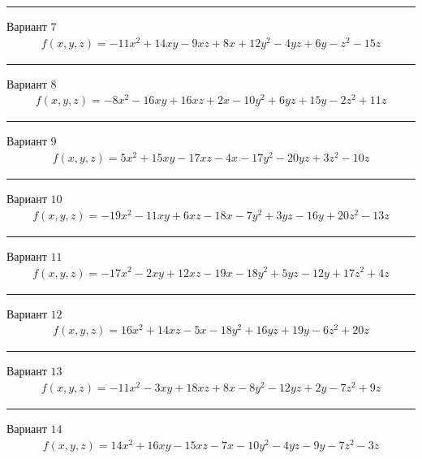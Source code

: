 \documentclass[11pt]{report}
\begin{document}
\begin{center}
\noindent\rule{8cm}{0.4pt}
\end{center}
Вариант $7$
\begin{align*}
    f(x, y, z) = - 11 x^{2} + 14 x y - 9 x z + 8 x + 12 y^{2} - 4 y z + 6 y - z^{2} - 15 z
\end{align*}
\begin{center}
\noindent\rule{8cm}{0.4pt}
\end{center}
Вариант $8$
\begin{align*}
    f(x, y, z) = - 8 x^{2} - 16 x y + 16 x z + 2 x - 10 y^{2} + 6 y z + 15 y - 2 z^{2} + 11 z
\end{align*}
\begin{center}
\noindent\rule{8cm}{0.4pt}
\end{center}
Вариант $9$
\begin{align*}
    f(x, y, z) = 5 x^{2} + 15 x y - 17 x z - 4 x - 17 y^{2} - 20 y z + 3 z^{2} - 10 z
\end{align*}
\begin{center}
\noindent\rule{8cm}{0.4pt}
\end{center}
Вариант $10$
\begin{align*}
    f(x, y, z) = - 19 x^{2} - 11 x y + 6 x z - 18 x - 7 y^{2} + 3 y z - 16 y + 20 z^{2} - 13 z
\end{align*}
\begin{center}
\noindent\rule{8cm}{0.4pt}
\end{center}
Вариант $11$
\begin{align*}
    f(x, y, z) = - 17 x^{2} - 2 x y + 12 x z - 19 x - 18 y^{2} + 5 y z - 12 y + 17 z^{2} + 4 z
\end{align*}
\begin{center}
\noindent\rule{8cm}{0.4pt}
\end{center}
Вариант $12$
\begin{align*}
    f(x, y, z) = 16 x^{2} + 14 x z - 5 x - 18 y^{2} + 16 y z + 19 y - 6 z^{2} + 20 z
\end{align*}
\begin{center}
\noindent\rule{8cm}{0.4pt}
\end{center}
Вариант $13$
\begin{align*}
    f(x, y, z) = - 11 x^{2} - 3 x y + 18 x z + 8 x - 8 y^{2} - 12 y z + 2 y - 7 z^{2} + 9 z
\end{align*}
\begin{center}
\noindent\rule{8cm}{0.4pt}
\end{center}
Вариант $14$
\begin{align*}
    f(x, y, z) = 14 x^{2} + 16 x y - 15 x z - 7 x - 10 y^{2} - 4 y z - 9 y - 7 z^{2} - 3 z
\end{align*}
\end{document}
